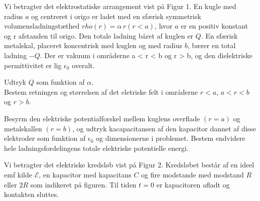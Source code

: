 
\title{\vspace{-1cm}\vspace{-1cm}}
\author{}
\date{}


\maketitle
\thispagestyle{fancy}
\begin{exercise}[Opgave 1]
Vi betragter det elektrostatiske arrangement vist på Figur 1. En kugle med radius $a$ og centreret i origo er ladet med en sfærisk symmetrisk volumensladningstæthed $rho\left( r \right) = \alpha\, r\left( r<a \right) $, hvor $a$ er en positiv konstant og r afstanden til origo. Den totale ladning båret af kuglen er $Q$. En sfærisk metalskal, placeret koncentrisk med kuglen og med radius $b$, bærer en total ladning $-Q$. Der er vakuum i områderne a < r < b og r > b, og den dielektriske
permittivitet er lig $\epsilon_0$ overalt.
\end{exercise}
\begin{figure}[ht]
    \centering
\end{figure}
\begin{subexercise}[a]
Udtryk $Q$ som funktion af $\alpha $.\\
Bestem retningen og størrelsen af det eletriske felt i områderne $r<a$,  $a<r<b$ og $r>b$.
\end{subexercise}
\begin{solution}

\end{solution}
\begin{subexercise}[b]
Besyrm den elektriske potentialforskel mellem kuglens overflade $\left( r=a \right) $ og metalskallen $\left( r=b \right) $, og udtryk kacapacitansen af den kapacitor dannet af disse elektroder som funktion af $\epsilon_0$ og dimensionerne i problemet. Bestem endvidere hele ladningsfordelingens totale elektriske potentielle energi.
\end{subexercise}
\begin{solution}

\end{solution}
\begin{exercise}[Opgave 2]
Vi betragter det elektriske kredsløb vist på Figur 2. Kredsløbet består af en ideel emf kilde $\mathcal{E} $, en kapacitor med  kapacitans $C$ og fire modstande med modstand $R$ eller $2R$ som indikeret på figuren. Til tiden $t=0$ er kapacitoren afladt og kontakten sluttes.
\end{exercise}
